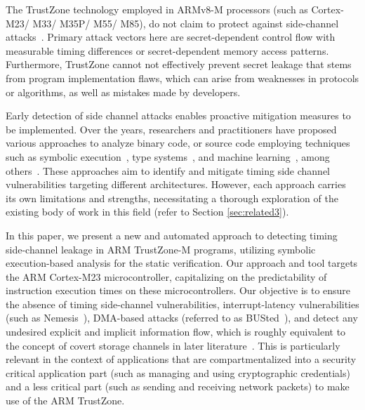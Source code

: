 The TrustZone technology employed in ARMv8-M processors (such as
Cortex-M23/ M33/ M35P/ M55/ M85), do not claim to protect against
side-channel attacks~\cite{armdeveloper}. Primary attack vectors here are
secret-dependent control flow with measurable timing differences or
secret-dependent memory access patterns.  Furthermore, TrustZone cannot not
effectively prevent secret leakage that stems from program implementation
flaws, which can arise from weaknesses in protocols or algorithms, as well
as mistakes made by developers.
%


Early detection of side channel attacks enables proactive mitigation
measures to be implemented. Over the years, researchers and practitioners
have proposed various approaches to analyze binary code, or source code
employing techniques such as symbolic execution~\cite{binsec, pitchfork},
type systems~\cite{scfmsp, MantelAVR, Agat, barthe2014system}, and machine
learning~\cite{MLforSC}, among others~\cite{timingattack}. These approaches
aim to identify and mitigate timing side channel vulnerabilities targeting
different architectures. However, each approach carries its own limitations
and strengths, necessitating a thorough exploration of the existing body of
work in this field (refer to Section \ref{sec:related3}).

In this paper, we present a new and automated approach to detecting timing
side-channel leakage in ARM TrustZone-M programs, utilizing symbolic
execution-based analysis for the static verification. Our approach and tool
targets the ARM Cortex-M23 microcontroller, capitalizing on the
predictability of instruction execution times on these microcontrollers.
Our objective is to ensure the absence of timing side-channel
vulnerabilities, interrupt-latency vulnerabilities (such as
Nemesis~\cite{Nemesis}), DMA-based attacks (referred to as
BUSted~\cite{busted}), and detect any undesired explicit and implicit
information flow, which is roughly equivalent to the concept of covert
storage channels in later literature~\cite{storagechannel}. This is
particularly relevant in the context of applications that are
compartmentalized into a security critical application part (such as
managing and using cryptographic credentials) and a less critical part
(such as sending and receiving network packets) to make use of the ARM
TrustZone. 

